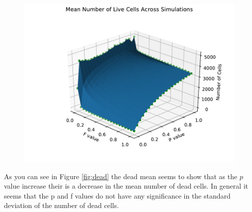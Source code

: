 \documentclass{article}
\begin{document}
\begin{figure}[H]
\centering
\includegraphics[scale=0.6]{Live Mean 3D.pdf}
\label{fig:livemean3D}
\end{figure}
As you can see in Figure \ref{fig:dead} the dead mean seems to show that as the $p$ value increase their is a decrease in the mean number of dead cells. In general it seems that the p and f values do not have any significance in the standard deviation of the number of dead cells.
\end{document}
